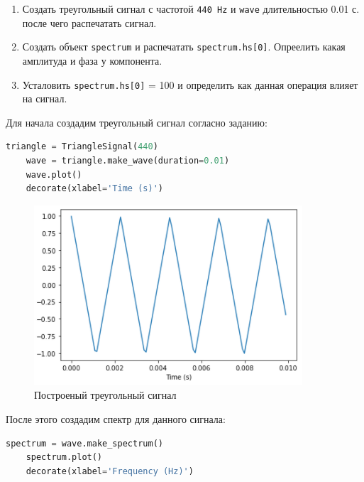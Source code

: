 \documentclass[a4paper]{article}
\begin{document}
                \begin{enumerate}
                    \item Создать треугольный сигнал с частотой \texttt{440 Hz} и \texttt{wave} длительностью 0.01 с. после чего распечатать сигнал.
                    \item Создать объект \texttt{spectrum} и распечатать \texttt{spectrum.hs[0]}. Опреелить какая амплитуда и фаза у компонента.
                    \item Усталовить \texttt{spectrum.hs[0]} = 100 и определить как данная операция влияет на сигнал.
                \end{enumerate}
            
            Для начала создадим треугольный сигнал согласно заданию:
            
\begin{lstlisting}[language=Python, caption= Построение треугольного сигнала]
    triangle = TriangleSignal(440)
    wave = triangle.make_wave(duration=0.01)
    wave.plot()
    decorate(xlabel='Time (s)')
\end{lstlisting}               
            
            \begin{figure}[H]
                \centering
                \includegraphics[width=\textwidth]{ex_4_triangle_signal.png}
                \caption{Построеный треугольный сигнал}
                \label{fig:ex_4_triangle_signal}
            \end{figure}
            
            После этого создадим спектр для данного сигнала:
            
\begin{lstlisting}[language=Python, caption= Спектр треугольного сигнала]
    spectrum = wave.make_spectrum()
    spectrum.plot()
    decorate(xlabel='Frequency (Hz)')
\end{lstlisting}               
            
\end{document}
